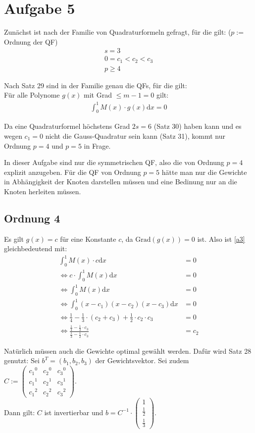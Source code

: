 \section*{Aufgabe 5}

Zunächst ist nach der Familie von Quadraturformeln gefragt, für die gilt: ($p := $ Ordnung der QF)
\begin{align}
	s = 3 \\
	0 = c_1 < c_2 < c_3 \\
	p \ge 4
\end{align}

Nach Satz 29 sind in der Familie genau die QFs, für die gilt: \\
Für alle Polynome $g(x)$ mit Grad $\le m-1 = 0$ gilt:
\begin{align}
	 \int_0^1 M(x) \cdot g(x) \mathrm{d}x = 0 \label{a3}
\end{align}

Da eine Quadraturformel höchstens Grad $2s=6$ (Satz 30) haben kann und es wegen
$c_1 = 0$ nicht die Gauss-Quadratur sein kann (Satz 31), kommt nur Ordnung $p=4$
und $p=5$ in Frage.

In dieser Aufgabe sind nur die symmetrischen QF, also die von Ordnung
$p=4$ explizit anzugeben. Für die QF von Ordnung $p=5$ hätte man nur
die Gewichte in Abhängigkeit der Knoten darstellen müssen und
eine Bedinung nur an die Knoten herleiten müssen.

\subsection*{Ordnung 4}
Es gilt $g(x) = c$ für eine Konstante $c$, da $\text{Grad}(g(x))=0$ ist.
Also ist \ref{a3} gleichbedeutend mit:
\begin{align}
	 \int_0^1 M(x) \cdot c \mathrm{d}x &= 0 \\
	 \Leftrightarrow c \cdot \int_0^1 M(x) \mathrm{d}x &= 0 \\
 	 \Leftrightarrow \int_0^1 M(x) \mathrm{d}x &= 0 \\
 	 \Leftrightarrow \int_0^1 (x-c_1)(x-c_2)(x-c_3) \mathrm{d}x &= 0 \\
 	 \Leftrightarrow \frac{1}{4} - \frac{1}{3} \cdot (c_2 + c_3) + \frac{1}{2} \cdot c_2 \cdot c_3 &= 0 \\
 	 \Leftrightarrow \frac{\frac{1}{4} - \frac{1}{3} \cdot c_3}
 	                      {\frac{1}{3} - \frac{1}{2} \cdot c_3} &= c_2
\end{align}

Natürlich müssen auch die Gewichte optimal gewählt werden. Dafür wird Satz 28 genutzt:
Sei $b^T = (b_1, b_2, b_3)$ der Gewichtsvektor. Sei zudem $C :=
\begin{pmatrix}
    {c_1}^0 & {c_2}^0 & {c_3}^0 \\
    {c_1}^1 & {c_2}^1 & {c_3}^1 \\
    {c_1}^2 & {c_2}^2 & {c_3}^2
\end{pmatrix}
$. \\
Dann gilt: $C$ ist invertierbar und $b = C^{-1} \cdot
\begin{pmatrix}
    1 \\
    \frac{1}{2} \\
    \frac{1}{3}
\end{pmatrix}
$.

